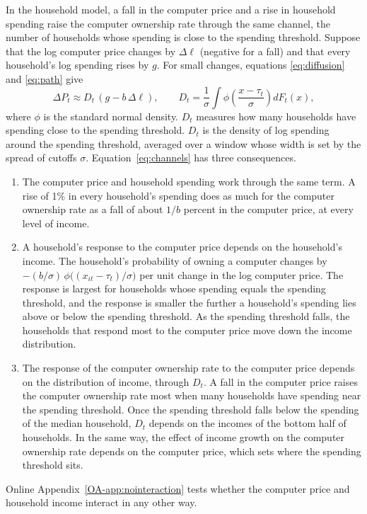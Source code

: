 \documentclass[11pt]{article}
\begin{document}
In the household model, a fall in the computer price and a rise in household spending raise the computer ownership rate through the same channel, the number of households whose spending is close to the spending threshold. Suppose that the log computer price changes by $\Delta\ell$ (negative for a fall) and that every household's log spending rises by $g$. For small changes, equations \eqref{eq:diffusion} and \eqref{eq:path} give
\begin{equation}
\Delta P_t \approx D_t\,(g - b\,\Delta\ell), \qquad D_t = \frac{1}{\sigma}\int \phi\!\left(\frac{x - \tau_t}{\sigma}\right) dF_t(x),
\label{eq:channels}
\end{equation}
where $\phi$ is the standard normal density. $D_t$ measures how many households have spending close to the spending threshold. $D_t$ is the density of log spending around the spending threshold, averaged over a window whose width is set by the spread of cutoffs $\sigma$. Equation~\eqref{eq:channels} has three consequences.
\begin{enumerate}
\item The computer price and household spending work through the same term. A rise of 1\% in every household's spending does as much for the computer ownership rate as a fall of about $1/b$ percent in the computer price, at every level of income.
\item A household's response to the computer price depends on the household's income. The household's probability of owning a computer changes by $-(b/\sigma)\,\phi\big((x_{it} - \tau_t)/\sigma\big)$ per unit change in the log computer price. The response is largest for households whose spending equals the spending threshold, and the response is smaller the further a household's spending lies above or below the spending threshold. As the spending threshold falls, the households that respond most to the computer price move down the income distribution.
\item The response of the computer ownership rate to the computer price depends on the distribution of income, through $D_t$. A fall in the computer price raises the computer ownership rate most when many households have spending near the spending threshold. Once the spending threshold falls below the spending of the median household, $D_t$ depends on the incomes of the bottom half of households. In the same way, the effect of income growth on the computer ownership rate depends on the computer price, which sets where the spending threshold sits.
\end{enumerate}
Online Appendix~\ref{OA-app:nointeraction} tests whether the computer price and household income interact in any other way.
\end{document}
